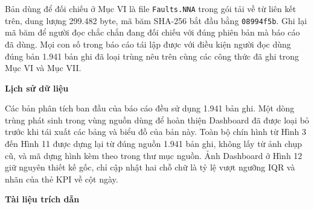 \documentclass[12pt]{article}
\begin{document}
\noindent Bản dùng để đối chiếu ở Mục VI là file \texttt{Faults.NNA} trong gói tải về từ liên kết trên, dung lượng 299.482 byte, mã băm SHA-256 bắt đầu bằng \texttt{08994f5b}. Ghi lại mã băm để người đọc chắc chắn đang đối chiếu với đúng phiên bản mà báo cáo đã dùng. Mọi con số trong báo cáo tái lập được với điều kiện người đọc dùng đúng bản 1.941 bản ghi đã loại trùng nêu trên cùng các công thức đã ghi trong Mục VI và Mục VII.

\vspace{0.4em}
\noindent \textbf{Lịch sử dữ liệu}

\noindent Các bản phân tích ban đầu của báo cáo đều sử dụng 1.941 bản ghi. Một dòng trùng phát sinh trong vùng nguồn dùng để hoàn thiện Dashboard đã được loại bỏ trước khi tái xuất các bảng và biểu đồ của bản này. Toàn bộ chín hình từ Hình 3 đến Hình 11 được dựng lại từ đúng nguồn 1.941 bản ghi, không lấy từ ảnh chụp cũ, và mã dựng hình kèm theo trong thư mục nguồn. Ảnh Dashboard ở Hình 12 giữ nguyên thiết kế gốc, chỉ cập nhật hai chỗ chữ là tỷ lệ vượt ngưỡng IQR và nhãn của thẻ KPI về cột ngày.

\vspace{0.4em}
\noindent \textbf{Tài liệu trích dẫn}

\printbibliography[heading=none]
\end{document}

